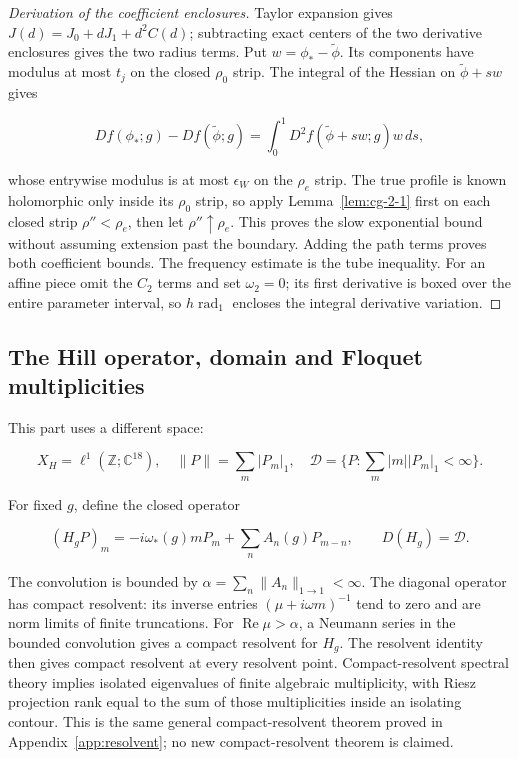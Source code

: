 \documentclass[11pt]{article}
\theoremstyle{definition}
\begin{document}
\begin{proof}[Derivation of the coefficient enclosures] Taylor expansion gives $J(d)=J_0+dJ_1+d^2C(d)$; subtracting exact centers of the two derivative enclosures gives the two radius terms. Put $w=\phi_* -\widetilde\phi$. Its components have modulus at most $t_j$ on the closed $\rho_0$ strip. The integral of the Hessian on $\widetilde\phi+sw$ gives

\[
 Df(\phi_*;g)-Df(\widetilde\phi;g)
 =\int_0^1D^2f(\widetilde\phi+sw;g)w\,ds,
\]

whose entrywise modulus is at most $\epsilon_W$ on the $\rho_e$ strip. The true profile is known holomorphic only inside its $\rho_0$ strip, so apply Lemma~\ref{lem:cg-2-1} first on each closed strip $\rho''<\rho_e$, then let $\rho''\uparrow\rho_e$. This proves the slow exponential bound without assuming extension past the boundary. Adding the path terms proves both coefficient bounds. The frequency estimate is the tube inequality. For an affine piece omit the $C_2$ terms and set $\omega_2=0$; its first derivative is boxed over the entire parameter interval, so $h\operatorname{rad}_1$ encloses the integral derivative variation. \end{proof}

\subsection{The Hill operator, domain and Floquet multiplicities}\label{sec:cg-7}

This part uses a different space:

\[
 X_H=\ell^1(\mathbb Z;\mathbb C^{18}),\quad
 \|P\|=\sum_m|P_m|_1,\quad
 \mathcal D=\{P:\sum_m|m||P_m|_1<\infty\}.
\]

For fixed $g$, define the closed operator

\[
 (H_gP)_m=-i\omega_*(g)mP_m+\sum_n A_n(g)P_{m-n},
 \qquad D(H_g)=\mathcal D.
\]

The convolution is bounded by $\alpha=\sum_n\|A_n\|_{1\to1}<\infty$. The diagonal operator has compact resolvent: its inverse entries $(\mu+i\omega m)^{-1}$ tend to zero and are norm limits of finite truncations. For $\operatorname{Re}\mu>\alpha$, a Neumann series in the bounded convolution gives a compact resolvent for $H_g$. The resolvent identity then gives compact resolvent at every resolvent point. Compact-resolvent spectral theory implies isolated eigenvalues of finite algebraic multiplicity, with Riesz projection rank equal to the sum of those multiplicities inside an isolating contour. This is the same general compact-resolvent theorem proved in Appendix~\ref{app:resolvent}; no new compact-resolvent theorem is claimed.
\end{document}
